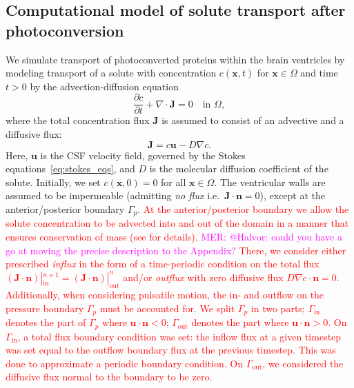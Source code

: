 \documentclass[fleqn]{wlscirep}
\newcommand{\pdifft}[1]{\frac{\partial  #1}{\partial t}}
\newcommand{\Gp}{\Gamma_{p}}
\newcommand{\Gin}{\Gamma_{\mathrm{in}}}
\newcommand{\Gout}{\Gamma_{\mathrm{out}}}
\newcommand{\nn}{\mathbf{n}}
\newcommand{\uu}{\mathbf{u}}
\newcommand{\xx}{\bm{x}}
\newcommand{\JJ}{\mathbf{J}}
\newcommand{\mer}[1]{\textcolor{magenta}{#1}}
\newcommand{\fixme}[1]{\textcolor{red}{#1}}
\begin{document}
\subsection*{Computational model of solute transport after photoconversion}
We simulate transport of photoconverted proteins within the brain ventricles by modeling transport of a solute with concentration $c(\xx, t)$ for $\xx\in\Omega$ and time $t > 0$ by the advection-diffusion equation
\begin{equation}
    \pdifft{c} + \nabla\cdot\JJ = 0 \quad \text{in } \Omega,
    \label{eq:adv_diff_strong}
\end{equation}
where the total concentration flux $\mathbf{J}$ is assumed to consist of an advective and a diffusive flux:
\begin{equation*}
    \JJ = c\uu - D\nabla c .
\end{equation*}
Here, $\uu$ is the CSF velocity field, governed by the Stokes equations~\eqref{eq:stokes_eqs}, and $D$ is the molecular diffusion coefficient of the solute. Initially, we set $c(\xx, 0)=0$ for all $\xx\in\Omega$. The ventricular walls are assumed to be impermeable (admitting \emph{no flux} i.e.~$\JJ\cdot\nn=0$), except at the anterior/posterior boundary $\Gamma_p$. \fixme{At the anterior/posterior boundary we allow the solute concentration to be advected into and out of the domain in a manner that ensures conservation of mass (see \Cref{sec:appendix:X} for details).}
\mer{MER: @Halvor: could you have a go at moving the precise description to the Appendix?}
\fixme{There, we consider either prescribed \emph{influx} in the form of a time-periodic condition on the total flux $(\JJ\cdot\nn)|_{\mathrm{in}}^{n+1}=(\JJ\cdot\nn)|_{\mathrm{out}}^{n}$ and/or \emph{outflux} with zero diffusive flux $D\nabla c\cdot\nn=0$.}
\fixme{Additionally, when considering pulsatile motion, the in- and outflow on the pressure boundary $\Gp$ must be accounted for. We split $\Gp$ in two parts; $\Gin$ denotes the part of $\Gp$ where $\uu\cdot\nn < 0$; $\Gout$ denotes the part where $\uu\cdot\nn > 0$. On $\Gin$, a total flux boundary condition was set: the inflow flux at a given timestep was set equal to the outflow boundary flux at the previous timestep. This was done to approximate a periodic boundary condition. On $\Gout$, we considered the diffusive flux normal to the boundary to be zero.}

\end{document}
